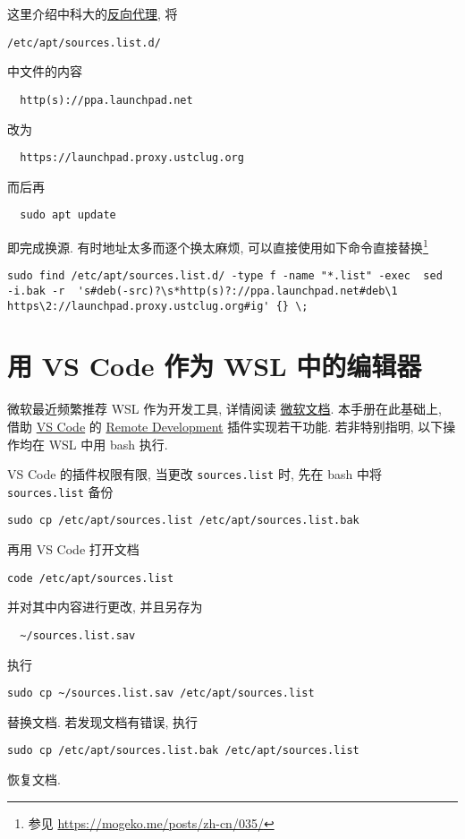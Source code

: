这里介绍中科大的\href{https://mirrors.ustc.edu.cn/}{反向代理},
将
\begin{lstlisting}[deletekeywords = apt]
  /etc/apt/sources.list.d/
\end{lstlisting}
中文件的内容
\begin{lstlisting}
  http(s)://ppa.launchpad.net
\end{lstlisting}
改为
\begin{lstlisting}
  https://launchpad.proxy.ustclug.org
\end{lstlisting}
而后再
\begin{lstlisting}
  sudo apt update
\end{lstlisting}
即完成换源.
有时地址太多而逐个换太麻烦,
可以直接使用如下命令直接替换\footnote{参见 \url{https://mogeko.me/posts/zh-cn/035/}}
\begin{lstlisting}[deletekeywords = apt]
  sudo find /etc/apt/sources.list.d/ -type f -name "*.list" -exec  sed  -i.bak -r  's#deb(-src)?\s*http(s)?://ppa.launchpad.net#deb\1 https\2://launchpad.proxy.ustclug.org#ig' {} \;
\end{lstlisting}

\section{用 VS Code 作为 WSL 中的编辑器}\label{sec:addition:wsl-editor}

微软最近频繁推荐 WSL 作为开发工具,
详情阅读%
\href{https://learn.microsoft.com/zh-cn/windows/wsl/tutorials/wsl-vscode}{微软文档}.
本手册在此基础上,
借助 \href{https://code.visualstudio.com/download}{VS Code} 的 \href{https://marketplace.visualstudio.com/items?itemName=ms-vscode-remote.vscode-remote-extensionpack}{Remote Development}
插件实现若干功能.
若非特别指明,
以下操作均在 WSL 中用 \textsf{bash} 执行.

VS Code 的插件权限有限,
当更改 \texttt{sources.list} 时,
先在 \textsf{bash} 中将 \texttt{sources.list} 备份
\begin{lstlisting}[deletekeywords = apt]
  sudo cp /etc/apt/sources.list /etc/apt/sources.list.bak
\end{lstlisting}
再用 VS Code 打开文档
\begin{lstlisting}[deletekeywords = apt, morekeywords = code]
  code /etc/apt/sources.list
\end{lstlisting}
并对其中内容进行更改,
并且另存为
\begin{lstlisting}
  ~/sources.list.sav
\end{lstlisting}
执行
\begin{lstlisting}[deletekeywords = apt]
  sudo cp ~/sources.list.sav /etc/apt/sources.list
\end{lstlisting}
替换文档.
若发现文档有错误,
执行
\begin{lstlisting}[deletekeywords = apt]
  sudo cp /etc/apt/sources.list.bak /etc/apt/sources.list
\end{lstlisting}
恢复文档.

